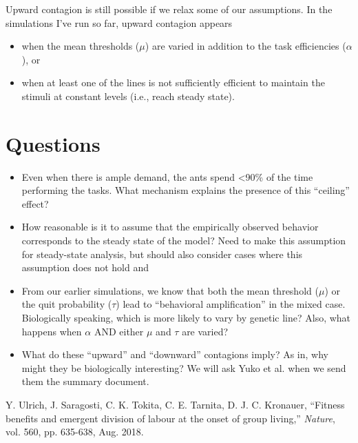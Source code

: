 \documentclass[10pt]{article}
\theoremstyle{remark}
\begin{document}
Upward contagion is still possible if we relax some of our assumptions. In the simulations I've run so far, upward contagion appears
\begin{itemize}
    \item when the mean thresholds ($\mu$) are varied in addition to the task efficiencies ($\alpha$), or
    \item when at least one of the lines is not sufficiently efficient to maintain the stimuli at constant levels (i.e., reach steady state).
\end{itemize}

\section{Questions}
\begin{itemize}
    \item {\color{orange}Even when there is ample demand, the ants spend <90\% of the time performing the tasks. What mechanism explains the presence of this ``ceiling'' effect?}
    
    \item How reasonable is it to assume that the empirically observed behavior corresponds to the steady state of the model? {\color{orange}Need to make this assumption for steady-state analysis, but should also consider cases where this assumption does not hold and }
    
    \item From our earlier simulations, we know that both the mean threshold ($\mu$) or the quit probability ($\tau$) lead to ``behavioral amplification'' in the mixed case.
    Biologically speaking, which is more likely to vary by genetic line? Also, what happens when $\alpha$ AND either $\mu$ and $\tau$ are varied?
    
    \item What do these ``upward'' and ``downward'' contagions imply? As in, why might they be biologically interesting? {\color{orange}We will ask Yuko et al. when we send them the summary document.}
\end{itemize}

\begin{thebibliography}{99}

 Y. Ulrich, J. Saragosti, C. K. Tokita, C. E. Tarnita, D. J. C. Kronauer, ``Fitness benefits and emergent division of labour at the onset of group living,'' \textit{Nature}, vol. 560, pp. 635-638, Aug. 2018.

\end{thebibliography}
\end{document}
